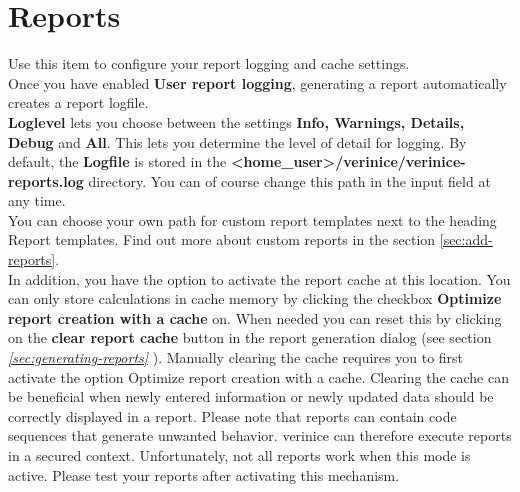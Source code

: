 \documentclass[a4paper,10pt]{book}
\begin{document}
\section{Reports} \label{Reports}
Use this item to configure your report logging and cache settings.
\newline\\
Once you have enabled \textbf{User report logging}, generating a report automatically creates a report logfile.
\newline\\
\textbf{Loglevel} lets you choose between the settings \textbf{Info, Warnings, Details, Debug} and \textbf{All}.
This lets you determine the level of detail for logging. By default, the \textbf{Logfile} is stored in the
\textbf{\textless home\_user\textgreater /verinice/verinice-reports.log} directory. You can of course change this path in the input field at any time.\\

You can choose your own path for custom report templates next to the
heading Report templates. Find out more about custom reports in the
section \ref{sec:add-reports}.\\

In addition, you have the option to activate the report cache at this location.
You can only store calculations in cache memory by clicking the checkbox
\textbf{Optimize report creation with a cache} on. When needed you can reset
this by clicking on the \textbf{clear report cache } button in the report
generation dialog (see section {\em \ref{sec:generating-reports}
}). Manually clearing the cache requires you to
first activate the option Optimize report creation with a cache. Clearing the
cache can be beneficial when newly entered information or newly updated data
should be correctly displayed in a report.
\newline
\newline
Please note that reports can contain code sequences that generate unwanted behavior. verinice can therefore execute reports in a secured context. Unfortunately, not all reports work when this mode is active. Please test your reports after activating this mechanism.
\end{document}
